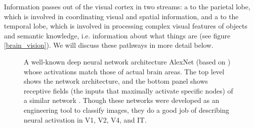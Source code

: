 Information passes out of the visual cortex in two streams: a  to the parietal lobe, which is involved in coordinating visual and spatial information, and a  to the temporal lobe, which is involved in processing complex visual features of objects and semantic knowledge, i.e. information about what things are  (see figure \ref{brain_vision}). We will discuss these pathways in more detail below.

\begin{figure}[h]
\centering
{}
\caption[From \cite{kriegeskorte2015deep}, which is in turn based on \cite{krizhevsky2012imagenet} and \cite{gucclu2015deep}.]{A well-known deep neural network architecture AlexNet (based on \cite{krizhevsky2012imagenet}) whose activations match those of actual brain areas. The top level shows the network architecture, and the bottom panel shows receptive fields (the inputs that maximally activate specific nodes) of a similar network \cite{gucclu2015deep}. Though these networks were developed as an engineering tool to classify images, they do a good job of describing neural activation in V1, V2, V4, and IT.}
\label{deepLearning_Vision}
\end{figure}

